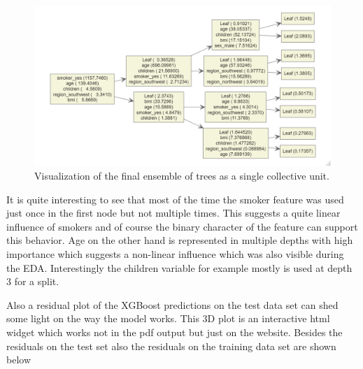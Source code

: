 \documentclass[
]{book}
\newenvironment{Shaded}{\begin{snugshade}}{\end{snugshade}}
\newcommand{\AttributeTok}[1]{\textcolor[rgb]{0.77,0.63,0.00}{#1}}
\newcommand{\CommentTok}[1]{\textcolor[rgb]{0.56,0.35,0.01}{\textit{#1}}}
\newcommand{\FunctionTok}[1]{\textcolor[rgb]{0.00,0.00,0.00}{#1}}
\newcommand{\NormalTok}[1]{#1}
\newcommand{\OtherTok}[1]{\textcolor[rgb]{0.56,0.35,0.01}{#1}}
\newcommand{\SpecialCharTok}[1]{\textcolor[rgb]{0.00,0.00,0.00}{#1}}
\begin{document}
\begin{Shaded}
\end{Shaded}

\begin{figure}

{\centering \includegraphics[width=0.7\linewidth]{_pictures/ins_multitree_xgb} 

}

\caption{Visualization of the final ensemble of trees as a single collective unit.}\label{fig:insmultitree}
\end{figure}

It is quite interesting to see that most of the time the smoker feature was used just once in the first node but not multiple times. This suggests a quite linear influence of smokers and of course the binary character of the feature can support this behavior. Age on the other hand is represented in multiple depths with high importance which suggests a non-linear influence which was also visible during the EDA. Interestingly the children variable for example mostly is used at depth 3 for a split.

Also a residual plot of the XGBoost predictions on the test data set can shed some light on the way the model works. This 3D plot is an interactive html widget which works not in the pdf output but just on the website. Besides the residuals on the test set also the residuals on the training data set are shown below
\end{document}

